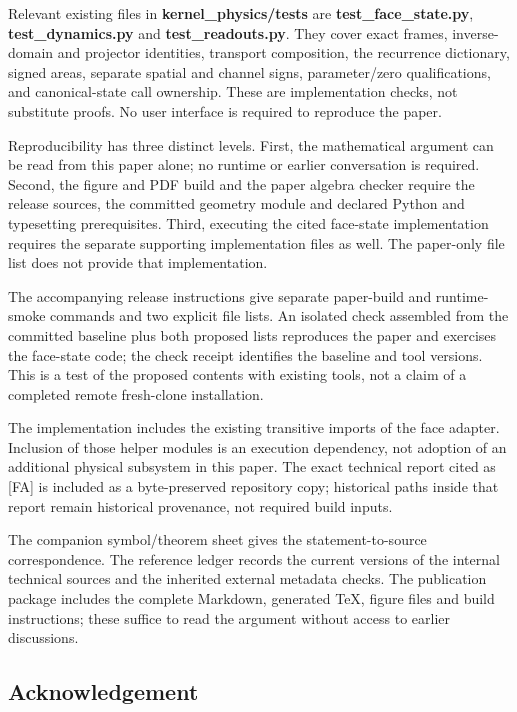 \documentclass[
  11pt,
  a4paper,
]{article}
\begin{document}
Relevant existing files in \textbf{kernel\_physics/tests} are \textbf{test\_face\_state.py}, \textbf{test\_dynamics.py} and \textbf{test\_readouts.py}. They cover exact frames, inverse-domain and projector identities, transport composition, the recurrence dictionary, signed areas, separate spatial and channel signs, parameter/zero qualifications, and canonical-state call ownership. These are implementation checks, not substitute proofs. No user interface is required to reproduce the paper.

Reproducibility has three distinct levels. First, the mathematical argument can be read from this paper alone; no runtime or earlier conversation is required. Second, the figure and PDF build and the paper algebra checker require the release sources, the committed geometry module and declared Python and typesetting prerequisites. Third, executing the cited face-state implementation requires the separate supporting implementation files as well. The paper-only file list does not provide that implementation.

The accompanying release instructions give separate paper-build and runtime-smoke commands and two explicit file lists. An isolated check assembled from the committed baseline plus both proposed lists reproduces the paper and exercises the face-state code; the check receipt identifies the baseline and tool versions. This is a test of the proposed contents with existing tools, not a claim of a completed remote fresh-clone installation.

The implementation includes the existing transitive imports of the face adapter. Inclusion of those helper modules is an execution dependency, not adoption of an additional physical subsystem in this paper. The exact technical report cited as {[}FA{]} is included as a byte-preserved repository copy; historical paths inside that report remain historical provenance, not required build inputs.

The companion symbol/theorem sheet gives the statement-to-source correspondence. The reference ledger records the current versions of the internal technical sources and the inherited external metadata checks. The publication package includes the complete Markdown, generated TeX, figure files and build instructions; these suffice to read the argument without access to earlier discussions.

\subsection{Acknowledgement}\label{acknowledgement}
\end{document}
